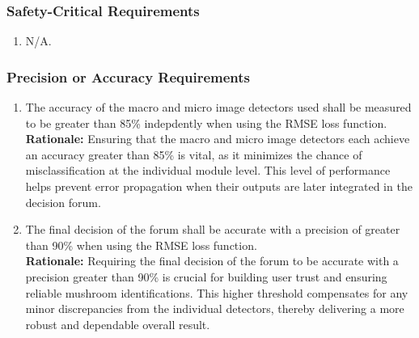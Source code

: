 \documentclass[]{article}
\begin{document}
\begin{enumerate}[{\bf BE1.}]
\begin{enumerate}[{PR-SL}1. ]
\end{enumerate}

\subsubsection{Safety-Critical Requirements}
\label{ssub:safety_critical_requirements}
\begin{enumerate}[{PR-SC}1. ]
	\item N/A.
\end{enumerate}

\subsubsection{Precision or Accuracy Requirements}
\label{ssub:precision_or_accuracy_requirements}
\begin{enumerate}[{PR-PA}1. ]
	\item The accuracy of the macro and micro image detectors used shall be measured to be greater than 85\% indepdently when using the RMSE loss function.\\
	\textbf{Rationale:} Ensuring that the macro and micro image detectors each achieve an accuracy greater than 85\% is vital, as it minimizes the chance of misclassification at the individual module level. This level of performance helps prevent error propagation when their outputs are later integrated in the decision forum.
	\item The final decision of the forum shall be accurate with a precision of greater than 90\% when using the RMSE loss function.\\
	\textbf{Rationale:} Requiring the final decision of the forum to be accurate with a precision greater than 90\% is crucial for building user trust and ensuring reliable mushroom identifications. This higher threshold compensates for any minor discrepancies from the individual detectors, thereby delivering a more robust and dependable overall result.
\end{enumerate}


\end{enumerate}
\end{document}
